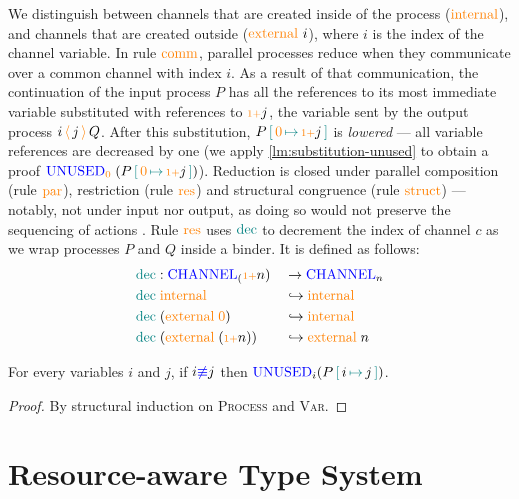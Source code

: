 \documentclass[]{llncs}
\newcommand{\type}[1]{\textcolor{blue}{\operatorname{#1}}}
\newcommand{\constr}[1]{\textcolor{orange}{\operatorname{#1}}}
\newcommand{\func}[1]{\textcolor{teal}{\operatorname{#1}}}
\newcommand{\send}[2]{#1 \, \constr{\langle} \, #2 \,\constr{\rangle} \,}
\newcommand{\suc}{\constr{\scriptstyle 1+}}
\newcommand{\subst}[3]{#1 \, \func{[} \, #3 \, \func{\mapsto} \,#2 \, \func{]}}
\newcommand{\Unused}{\type{UNUSED}}
\newcommand{\Channel}{\type{CHANNEL}}
\begin{document}
We distinguish between channels that are created inside of the process ($\constr{internal}$), and channels that are created outside ($\constr{external}\ i$), where $i$ is the index of the channel variable.
In rule $\constr{comm}$, parallel processes reduce when they communicate over a common channel with index ${i}$.
As a result of that communication, the continuation of the input process $P$ has all the references to its most immediate variable substituted with references to $\suc j$, the variable sent by the output process $\send{i}{j}{Q}$.
After this substitution, $\subst{P}{\suc j}{\constr{0}}$ is \emph{lowered} --- all variable references are decreased by one (we apply \autoref{lm:substitution-unused} to obtain a proof $\Unused_{\constr{0}} \; (\subst{P}{\suc j}{\constr{0}})$).
Reduction is closed under parallel composition (rule $\constr{par}$), restriction (rule $\constr{res}$) and structural congruence (rule $\constr{struct}$) 
--- notably, not under input nor output, as doing so would not preserve the sequencing of actions \cite{Sangio01}.
Rule $\constr{res}$ uses $\func{dec}$ to decrement the index of channel $c$ as we wrap processes $P$ and $Q$ inside a binder.
It is defined as follows:
\begin{equation*}
  \begin{aligned}
    & \func{dec} : \Channel_(\suc n) && \to \Channel_n \\
    & \func{dec} \; \constr{internal}                 && \hookrightarrow \constr{internal} \\
    & \func{dec} \; (\constr{external} \; \constr{0}) && \hookrightarrow \constr{internal} \\
    & \func{dec} \; (\constr{external} \; (\suc n))   && \hookrightarrow \constr{external} \; n \\
  \end{aligned}
\end{equation*}

\begin{nilemma}
  \label{lm:substitution-unused}
  For every variables $i$ and $j$, if $i \type{\not\equiv} j$ then $\Unused_i \allowbreak (\subst{P}{j}{i})$.
\end{nilemma}
\begin{proof}
  By structural induction on \textsc{Process} and \textsc{Var}.
\end{proof}


\section{Resource-aware Type System}
\label{type-system}
\end{document}
